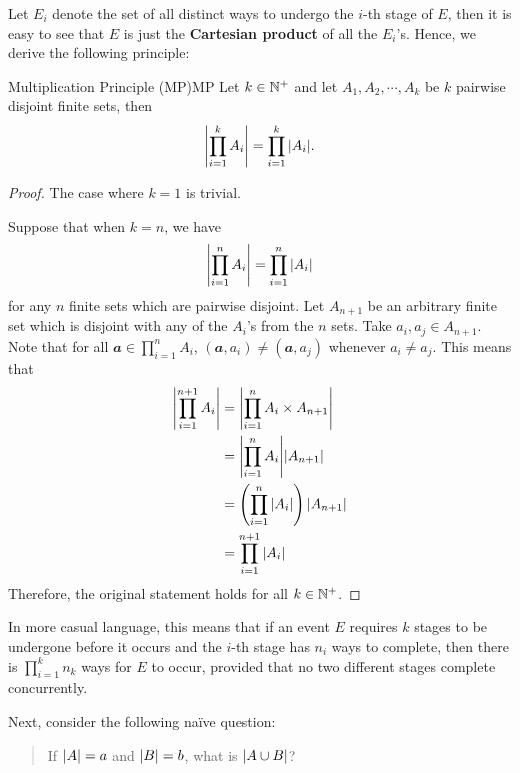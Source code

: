 \documentclass[math]{amznotes}
\theoremstyle{remark}
\newcommand{\0}{\mathbf{0}}
\newcommand{\1}{\mathbf{1}}
\begin{document}
Let $E_i$ denote the set of all distinct ways to undergo the $i$-th stage of $E$, then it is easy to see that $E$ is just the \textbf{Cartesian product} of all the $E_i$'s. Hence, we derive the following principle:
\begin{thmbox}{Multiplication Principle (MP)}{MP}
    Let $k \in \mathbb{N}^+$ and let $A_1, A_2, \cdots, A_k$ be $k$ pairwise disjoint finite sets, then
    \begin{equation*}
        {\left\lvert {\prod_{i = 1}^{k}A_i} \right\rvert} = \prod_{i = 1}^{k}{\left\lvert {A_i} \right\rvert}.
    \end{equation*}
    \tcblower
    \begin{proof}
        The case where $k = 1$ is trivial.

        Suppose that when $k = n$, we have
        \begin{equation*}
            {\left\lvert {\prod_{i = 1}^{n}A_i} \right\rvert} = \prod_{i = 1}^{n}{\left\lvert {A_i} \right\rvert}
        \end{equation*} 
        for any $n$ finite sets which are pairwise disjoint. Let $A_{n + 1}$ be an arbitrary finite set which is disjoint with any of the $A_i$'s from the $n$ sets. Take $a_i, a_j \in A_{n + 1}$. Note that for all $\mathbfit{a} \in \prod_{i = 1}^{n}A_i$, $(\mathbfit{a}, a_i) \neq (\mathbfit{a}, a_j)$ whenever $a_i \neq a_j$. This means that
        \begin{align*}
            {\left\lvert {\prod_{i = 1}^{n + 1}A_i} \right\rvert} & = {\left\lvert {\prod_{i = 1}^{n}A_i \times A_{n + 1}} \right\rvert} \\
            & = {\left\lvert {\prod_{i = 1}^{n}A_i} \right\rvert}{\left\lvert {A_{n + 1}} \right\rvert} \\
            & = \left(\prod_{i = 1}^{n}{\left\lvert {A_i} \right\rvert}\right){\left\lvert {A_{n + 1}} \right\rvert} \\
            & = \prod_{i = 1}^{n + 1}{\left\lvert {A_i} \right\rvert}
        \end{align*}
        Therefore, the original statement holds for all $k \in \mathbb{N}^+$.
    \end{proof}
\end{thmbox}
\begin{notebox}
    In more casual language, this means that if an event $E$ requires $k$ stages to be undergone before it occurs and the $i$-th stage has $n_i$ ways to complete, then there is $\prod_{i = 1}^{k}n_k$ ways for $E$ to occur, provided that no two different stages complete concurrently.
\end{notebox}
Next, consider the following naïve question:
\begin{quote}
    If ${\left\lvert {A} \right\rvert} = a$ and ${\left\lvert {B} \right\rvert} = b$, what is ${\left\lvert {A \cup B} \right\rvert}$?
\end{quote}
\end{document}
